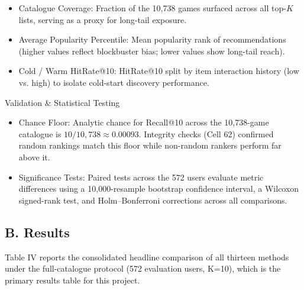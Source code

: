 \documentclass[conference]{IEEEtran}
\begin{document}
\begin{itemize}

\item Catalogue Coverage: Fraction of the 10,738 games surfaced across all top-$K$ lists, serving as a proxy for long-tail exposure.

\end{itemize}

\begin{itemize}

\item Average Popularity Percentile: Mean popularity rank of recommendations (higher values reflect blockbuster bias; lower values show long-tail reach).

\end{itemize}

\begin{itemize}

\item Cold / Warm HitRate@10: HitRate@10 split by item interaction history (low vs. high) to isolate cold-start discovery performance.

\end{itemize}

Validation \& Statistical Testing

\begin{itemize}

\item Chance Floor: Analytic chance for Recall@10 across the 10,738-game catalogue is $10/10,738 \approx 0.00093$. Integrity checks (Cell 62) confirmed random rankings match this floor while non-random rankers perform far above it.

\end{itemize}

\begin{itemize}

\item Significance Tests: Paired tests across the 572 users evaluate metric differences using a 10,000-resample bootstrap confidence interval, a Wilcoxon signed-rank test, and Holm--Bonferroni corrections across all comparisons.

\end{itemize}

\subsection*{B. Results}

Table IV reports the consolidated headline comparison of all thirteen methods under the full-catalogue protocol (572 evaluation users, K=10), which is the primary results table for this project.
\end{document}
